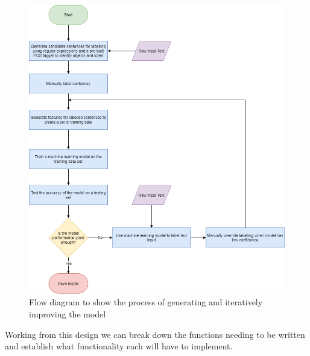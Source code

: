 \documentclass[11pt,oneside]{book}
\begin{document}
\begin{figure}[!htbp]
\centering
\includegraphics[scale=0.6]{figures/ModelFlowDiagram.png}
\caption{Flow diagram to show the process of generating and iteratively improving the model}
\label{fig:model_flow}
\end{figure}
\newpage

Working from this design we can break down the functions needing to be written and establish what functionality each will have to implement. 
\end{document}
